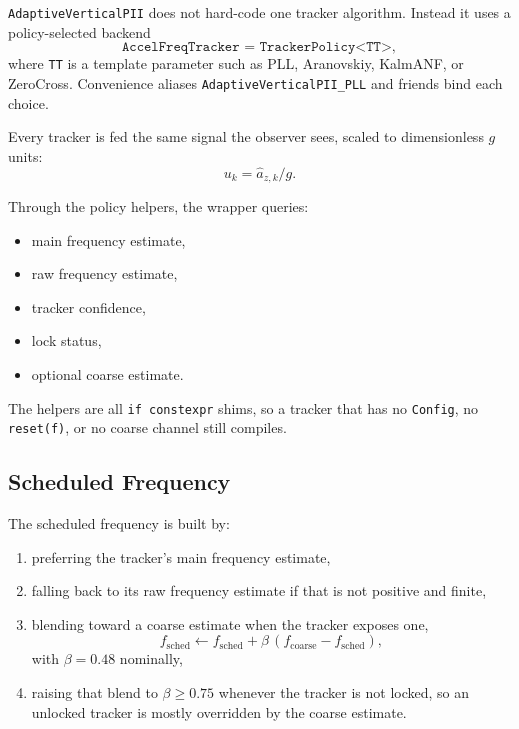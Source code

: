 \documentclass[conference]{IEEEtran}
\begin{document}
    \texttt{AdaptiveVerticalPII} does not hard-code one tracker algorithm.
    Instead it uses a policy-selected backend
    \begin{equation}
        \texttt{AccelFreqTracker = TrackerPolicy<TT>},
    \end{equation}
    where \texttt{TT} is a template parameter such as PLL, Aranovskiy, KalmANF,
    or ZeroCross. Convenience aliases
    \texttt{AdaptiveVerticalPII\_PLL} and friends bind each choice.

    Every tracker is fed the same signal the observer sees, scaled to
    dimensionless \(g\) units:
    \begin{equation}
        u_k = \hat{a}_{z,k}/g.
    \end{equation}

    Through the policy helpers, the wrapper queries:
    \begin{itemize}[leftmargin=1.4em]
        \item main frequency estimate,
        \item raw frequency estimate,
        \item tracker confidence,
        \item lock status,
        \item optional coarse estimate.
    \end{itemize}
    The helpers are all \texttt{if constexpr} shims, so a tracker that has no
    \texttt{Config}, no \texttt{reset(f)}, or no coarse channel still compiles.

    \subsection{Scheduled Frequency}

    The scheduled frequency is built by:
    \begin{enumerate}[leftmargin=1.5em]
        \item preferring the tracker's main frequency estimate,
        \item falling back to its raw frequency estimate if that is not positive
        and finite,
        \item blending toward a coarse estimate when the tracker exposes one,
        \begin{equation}
            f_{\mathrm{sched}} \leftarrow
            f_{\mathrm{sched}} + \beta\,(f_{\mathrm{coarse}}-f_{\mathrm{sched}}),
        \end{equation}
        with \(\beta = 0.48\) nominally,
        \item raising that blend to \(\beta \ge 0.75\) whenever the tracker is
        not locked, so an unlocked tracker is mostly overridden by the coarse
        estimate.
    \end{enumerate}
\end{document}
